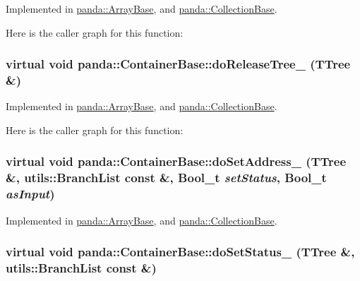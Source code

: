Implemented in \hyperlink{classpanda_1_1ArrayBase_a945c9cf4d4a979891c11cdfca5e7241f}{panda::ArrayBase}, and \hyperlink{classpanda_1_1CollectionBase_a885ed7e0cd0d0f37f913db20597fcd3c}{panda::CollectionBase}.

Here is the caller graph for this function:\hypertarget{classpanda_1_1ContainerBase_af5628a554142af0fcbbec3f28edd1666}{
\subsubsection[{doReleaseTree\_\-}]{\setlength{\rightskip}{0pt plus 5cm}virtual void panda::ContainerBase::doReleaseTree\_\- (TTree \&)}}
\label{classpanda_1_1ContainerBase_af5628a554142af0fcbbec3f28edd1666}


Implemented in \hyperlink{classpanda_1_1ArrayBase_a4fecec0749650b43c4eb3110e60fa193}{panda::ArrayBase}, and \hyperlink{classpanda_1_1CollectionBase_ac9d4543501718f3fa96366e43fde46bc}{panda::CollectionBase}.

Here is the caller graph for this function:\hypertarget{classpanda_1_1ContainerBase_a1f8b467981e2d6e55cf1b1e355e4eb93}{
\subsubsection[{doSetAddress\_\-}]{\setlength{\rightskip}{0pt plus 5cm}virtual void panda::ContainerBase::doSetAddress\_\- (TTree \&, \/  {\bf utils::BranchList} const \&, \/  Bool\_\-t {\em setStatus}, \/  Bool\_\-t {\em asInput})}}
\label{classpanda_1_1ContainerBase_a1f8b467981e2d6e55cf1b1e355e4eb93}


Implemented in \hyperlink{classpanda_1_1ArrayBase_a1ddaf0aff0dd758a0c4d99d0422db5b0}{panda::ArrayBase}, and \hyperlink{classpanda_1_1CollectionBase_a2bd8c03841337f83ccdb4279ebf1f24d}{panda::CollectionBase}.\hypertarget{classpanda_1_1ContainerBase_aaae758928771e25de7c62db2fc9de750}{
\subsubsection[{doSetStatus\_\-}]{\setlength{\rightskip}{0pt plus 5cm}virtual void panda::ContainerBase::doSetStatus\_\- (TTree \&, \/  {\bf utils::BranchList} const \&)}}
\label{classpanda_1_1ContainerBase_aaae758928771e25de7c62db2fc9de750}


